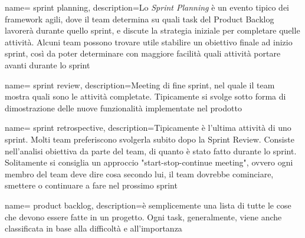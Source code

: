 {
	name= sprint planning,
	description={Lo \emph{Sprint Planning} è un evento tipico dei framework agili, dove il team determina su quali task del Product Backlog lavorerà durante quello sprint, e discute la strategia iniziale per completare quelle attività. Alcuni team possono trovare utile stabilire un obiettivo finale ad inizio sprint, così da poter determinare con maggiore facilità quali attività portare avanti durante lo sprint}
}

{
	name= sprint review,
	description={Meeting di fine sprint, nel quale il team mostra quali sono le attività completate. Tipicamente si svolge sotto forma di dimostrazione delle nuove funzionalità implementate nel prodotto}
}

{
	name= sprint retrospective,
	description={Tipicamente è l'ultima attività di uno sprint. Molti team preferiscono svolgerla subito dopo la Sprint Review. Consiste nell'analisi obiettiva da parte del team, di quanto è stato fatto durante lo sprint. Solitamente si consiglia un approccio "start-stop-continue meeting", ovvero ogni membro del team deve dire cosa secondo lui, il team dovrebbe cominciare, smettere o continuare a fare nel prossimo sprint}
}

{
	name= product backlog,
	description={è semplicemente una lista di tutte le cose che devono essere fatte in un progetto. Ogni task, generalmente, viene anche classificata in base alla difficoltà e all'importanza}
}